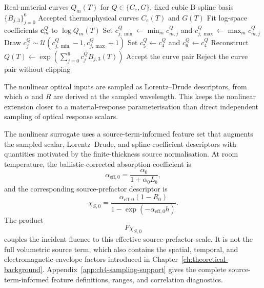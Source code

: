 \begin{algorithm}[htbp]
    \caption{Spline-based nonlinear $C_e/G$ thermophysical sampling}
    \label{alg:ch4-nonlinear-ceg-sampling}
    \begin{algorithmic}[1]
        \Require Real-material curves $Q_m(T)$ for $Q\in\{C_e,G\}$, fixed cubic B-spline basis $\{B_{j,3}\}_{j=0}^{6}$
        \Ensure Accepted thermophysical curves $C_e(T)$ and $G(T)$
        \State Fit log-space coefficients $\mathbf{c}^{Q}_{m}$ to $\log Q_m(T)$
        \EndFor
        \State Set $c^{Q}_{j,\min}\gets\min_m c^{Q}_{m,j}$ and $c^{Q}_{j,\max}\gets\max_m c^{Q}_{m,j}$
        \EndFor
        \State Draw $c_j^Q\sim\mathcal{U}(c^{Q}_{j,\min}-1,c^{Q}_{j,\max}+1)$
        \EndFor
        \State Set $c_5^Q\gets c_4^Q$ and $c_6^Q\gets c_4^Q$
        \State Reconstruct $Q(T)\gets\exp\!\left(\sum_{j=0}^{6}c_j^Q B_{j,3}(T)\right)$
        \EndFor
        \State Accept the curve pair
        \Else
        \State Reject the curve pair without clipping
        \EndIf
    \end{algorithmic}
\end{algorithm}

The nonlinear optical inputs are sampled as Lorentz--Drude descriptors, from which $\alpha$ and $R$ are derived at the sampled wavelength. This keeps the nonlinear extension closer to a material-response parameterisation than direct independent sampling of optical response scalars.

The nonlinear surrogate uses a source-term-informed feature set that augments the sampled scalar, Lorentz--Drude, and spline-coefficient descriptors with quantities motivated by the finite-thickness source normalisation. At room temperature, the ballistic-corrected absorption coefficient is
\begin{equation}
    \alpha_{\mathrm{eff},0}
    =
    \frac{\alpha_0}{1+\alpha_0 L_b},
\end{equation}
and the corresponding source-prefactor descriptor is
\begin{equation}
    \chi_{S,0}
    =
    \frac{
        \alpha_{\mathrm{eff},0}(1-R_0)
    }{
        1-\exp(-\alpha_{\mathrm{eff},0}h)
    }.
\end{equation}
The product
\begin{equation}
    F\chi_{S,0}
\end{equation}
couples the incident fluence to this effective source-prefactor scale. It is not the full volumetric source term, which also contains the spatial, temporal, and electromagnetic-envelope factors introduced in Chapter~\ref{ch:theoretical-background}. Appendix~\ref{app:ch4-sampling-support} gives the complete source-term-informed feature definitions, ranges, and correlation diagnostics.

